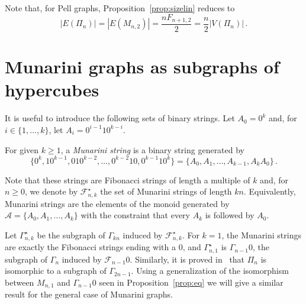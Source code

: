 \documentclass[11pt]{article}
\newcommand{\Fib}{{\mathcal F}}
\newcommand{\A}{{\mathcal A}}
\begin{document}
Note that, for Pell graphs, Proposition~\ref{prop:sizelin} reduces to $$|E(\Pi_{n})|=|E(M_{n,2})|=\frac{nF_{n+1,2}}{2}= \frac{n}{2}|V(\Pi_{n})|\,.$$




\section{Munarini graphs as subgraphs of hypercubes}
\label{sec:sub}
 It is useful to introduce the following sets of binary strings. 
Let  $A_0=0^k$ and, for $i\in \{1,\ldots,k\}$, let $A_i=0^{i-1}10^{k-i}$.

For given $k\geq 1$, a \emph{Munarini string} is a binary string generated by $$\{0^k,10^{k-1},010^{k-2},\ldots,0^{k-2}10,0^{k-1}10^k\}=\{A_0,A_1,\ldots,A_{k-1}, A_kA_0\}\,.$$

 Note that these strings are Fibonacci strings of length a multiple of $k$ and, for $n\geq0$, we denote by $\Fib_{n,k}^\star$ the set of Munarini strings of length $kn$.
Equivalently, Munarini strings are the elements of the monoid generated by $\A=\{A_0,A_1,\ldots,A_k\}$ with the constraint that every $A_k$ is followed by $A_0$.

Let $\Gamma_{n,k}^\star$ be the subgraph of $\Gamma_{kn}$ induced by $\Fib_{n,k}^\star$. 
For $k=1$, the Munarini strings are exactly the Fibonacci strings ending with a $0$, and $\Gamma_{n,1}^\star$ is $\Gamma_{n-1}0$, the subgraph of $\Gamma_{n}$ induced by $\Fib_{n-1}0$. Similarly, it is proved in~\cite{M-2019} that  $\Pi_n$ is isomorphic to a subgraph of $\Gamma_{2n-1}$. Using a generalization of the isomorphism between $M_{n,1}$ and $\Gamma_{n-1}0$ seen in Proposition~\ref{prop:eq} we will give a similar result for the general case of Munarini graphs.
\end{document}
